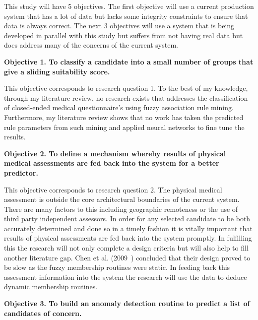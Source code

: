 


This study will have 5 objectives. The first objective will use a current production system that has a lot of data but lacks some integrity constraints to ensure that data is always correct. The next 3 objectives will use a system that is being developed in parallel with this study but suffers from not having real data but does address many of the concerns of the current system.

\textbf{Objective 1. To classify a candidate into a small number of groups that give a sliding suitability score.}

This objective corresponds to research question 1. To the best of my knowledge, through my literature review, no research exists that addresses the classification of closed-ended medical questionnaire's using fuzzy association rule mining. Furthermore, my literature review shows that no work has taken the predicted rule parameters from such mining and applied neural networks to fine tune the results.

\textbf{Objective 2. To define a mechanism whereby results of physical medical assessments are fed back into the system for a better predictor.}

This objective corresponds to research question 2. The physical medical assessment is outside the core architectural boundaries of the current system. There are many factors to this including geographic remoteness or the use of third party independent assessors. In order for any selected candidate to be both accurately determined and done so in a timely fashion it is vitally important that results of physical assessments are fed back into the system promptly. In fulfilling this the research will not only complete a design criteria but will also help to fill another literature gap. Chen et al. (2009~\cite{chen2009mining}) concluded that their design proved to be slow as the fuzzy membership routines were static. In feeding back this assessment information into the system the research will use the data to deduce dynamic membership routines.

\textbf{Objective 3. To build an anomaly detection routine to predict a list of candidates of concern.}

